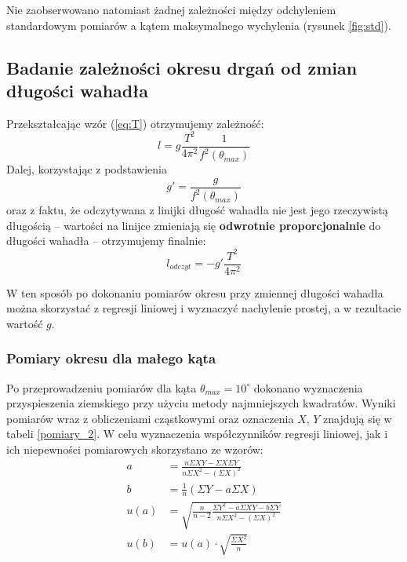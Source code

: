 \documentclass[a4paper]{article}
\newlength{\du}
\begin{document}

Nie zaobserwowano natomiast żadnej zależności między odchyleniem standardowym pomiarów 
a kątem maksymalnego wychylenia (rysunek \ref{fig:std}).




\subsection{Badanie zależności okresu drgań od zmian długości wahadła}

Przekształcając wzór (\ref{eq:T})  otrzymujemy zależność:
\[l = g\frac{T^2}{4\pi^2}\frac{1}{f^2(\theta_{max})} \]
Dalej, korzystając z podstawienia \[g' = \frac{g}{f^2(\theta_{max})} \]
oraz z faktu, że odczytywana z linijki długość wahadła nie jest jego rzeczywistą długością --
wartości na linijce zmieniają się \textbf{odwrotnie proporcjonalnie} do długości wahadła --
otrzymujemy finalnie:
\begin{equation} \label{eq:l_wzg}
 l_{odczyt} = -g'\frac{T^2}{4\pi^2}
\end{equation}

W ten sposób po dokonaniu pomiarów okresu przy zmiennej długości wahadła można skorzystać z regresji liniowej i wyznaczyć nachylenie prostej, a w rezultacie wartość $g$.

\subsubsection{Pomiary okresu dla małego kąta}

Po przeprowadzeniu pomiarów dla kąta $\theta_{max} = 10^\circ$ dokonano wyznaczenia 
przyspieszenia ziemskiego przy użyciu metody najmniejszych kwadratów. 
Wyniki pomiarów wraz z obliczeniami cząstkowymi oraz oznaczenia $X$, $Y$ znajdują się w tabeli \ref{pomiary_2}.
W celu wyznaczenia współczynników regresji liniowej, jak i ich niepewności pomiarowych skorzystano ze wzorów:
\begin{align*}
a &= \frac{n \Sigma X Y - \Sigma X \Sigma Y}{n \Sigma X^2 - \left(\Sigma X\right)^2} \\
b &= \frac{1}{n}\left(\Sigma Y - a \Sigma X\right) \\
u(a) &= \sqrt{\frac{n}{n-2} \frac{\Sigma Y^2 - a\Sigma XY - b\Sigma Y}{n\Sigma X^2-\left(\Sigma X \right)^2}} \\
u(b) &= u(a)\cdot \sqrt{\frac{\Sigma X^2}{n}}
\end{align*}
\end{document}
